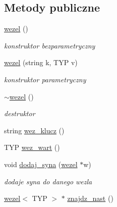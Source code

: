 \subsection*{Metody publiczne}
\begin{DoxyCompactItemize}
\item 
\hyperlink{classwezel_aa6eb4023b2cdc882869319045e3c440c}{wezel} ()
\begin{DoxyCompactList}\small\item\em konstruktor bezparametryczny \end{DoxyCompactList}\item 
\hyperlink{classwezel_aa3ce16f9db7f22de8c8e5869f956a35c}{wezel} (string k, T\-Y\-P v)
\begin{DoxyCompactList}\small\item\em konstruktor parametryczny \end{DoxyCompactList}\item 
\hyperlink{classwezel_a968f2a16240584139740af96640be730}{$\sim$wezel} ()
\begin{DoxyCompactList}\small\item\em destruktor \end{DoxyCompactList}\item 
string \hyperlink{classwezel_a2d01a9345190a1e1a5988802465da07e}{wez\-\_\-klucz} ()
\item 
T\-Y\-P \hyperlink{classwezel_a92d30ad2053c6146ccb6984b0049d2d9}{wez\-\_\-wart} ()
\item 
void \hyperlink{classwezel_ae0b0c58bee96c0ca205549a69d7197a7}{dodaj\-\_\-syna} (\hyperlink{classwezel}{wezel} $\ast$w)
\begin{DoxyCompactList}\small\item\em dodaje syna do danego wezla \end{DoxyCompactList}\item 
\hyperlink{classwezel}{wezel}$<$ T\-Y\-P $>$ $\ast$ \hyperlink{classwezel_a4c9fdab031ecfd4c4a99e78752930d13}{znajdz\-\_\-nast} ()
\end{DoxyCompactItemize}
